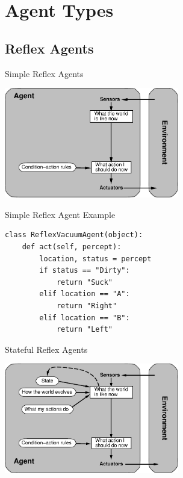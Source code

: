 \documentclass[14pt]{beamer}
\begin{document}
\section{Agent Types}

\subsection{Reflex Agents}

\begin{frame}{Simple Reflex Agents}
\begin{center}
\includegraphics[width=3in]{simple-reflex-agent.pdf}
\end{center}
\end{frame}

\begin{frame}[fragile]{Simple Reflex Agent Example}
\begin{lstlisting}
class ReflexVacuumAgent(object):
    def act(self, percept):
        location, status = percept
        if status == "Dirty":
            return "Suck"
        elif location == "A":
            return "Right"
        elif location == "B":
            return "Left"
\end{lstlisting}
\end{frame}

\begin{frame}{Stateful Reflex Agents}
\begin{center}
\includegraphics[width=3in]{reflex+state-agent.pdf}
\end{center}
\end{frame}
\end{document}

